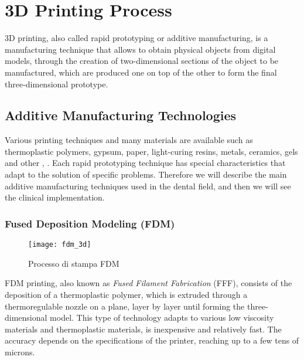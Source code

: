 
\chapter{3D Printing Process} %

\label{Chapter5} %


3D printing, also called rapid prototyping or additive manufacturing, is a manufacturing technique that allows to obtain physical objects from digital models, through the creation of two-dimensional sections of the object to be manufactured, which are produced one on top of the other to form the final three-dimensional prototype.

\section{Additive Manufacturing Technologies}
Various printing techniques and many materials are available such as thermoplastic polymers, gypsum, paper, light-curing resins, metals, ceramics, gels and other \parencite{Reference119}, \parencite{Reference120}. Each rapid prototyping technique has special characteristics that adapt to the solution of specific problems. Therefore we will describe the main additive manufacturing techniques used in the dental field, and then we will see the clinical implementation.

\subsection{Fused Deposition Modeling (FDM)}
\begin{wrapfigure} {R} {0.4\textwidth}
\vspace{-40pt}
	\begin{center}
	\texttt{[image: fdm\_3d]}
    \caption{Processo di stampa FDM}
    \label{fig:fdm_3d}
	\end{center}
\vspace{-40pt}
\end{wrapfigure}
FDM printing, also known as \emph{Fused Filament Fabrication} (FFF), consists of the deposition of a thermoplastic polymer, which is extruded through a thermoregulable nozzle on a plane, layer by layer until forming the three-dimensional model. This type of technology adapts to various low viscosity materials and thermoplastic materials, is inexpensive and relatively fast. The accuracy depends on the specifications of the printer, reaching up to a few tens of microns.
\pagebreak

